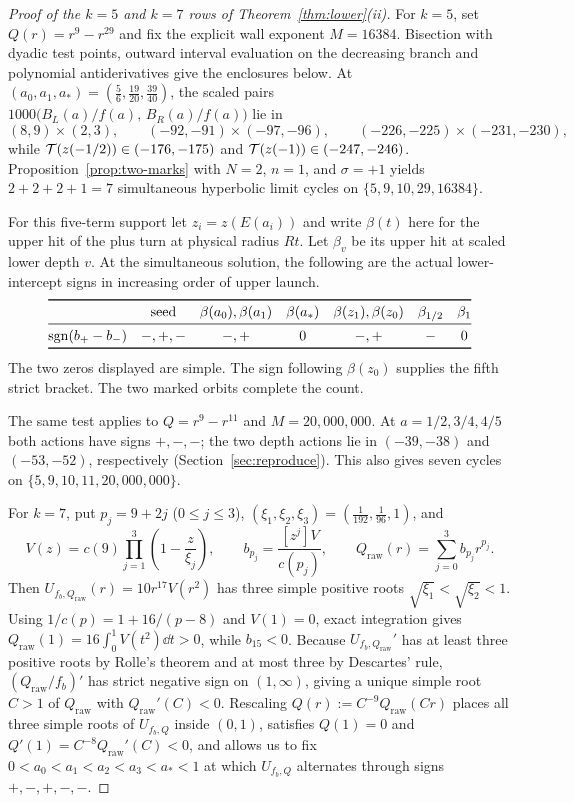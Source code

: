 \begin{proof}[Proof of the $k=5$ and $k=7$ rows of Theorem~\ref{thm:lower}\textup{(ii)}]
For $k=5$, set $Q(r)=r^9-r^{29}$ and fix the explicit wall exponent $M=16384$. Bisection with dyadic test points, outward interval evaluation on the
decreasing branch and polynomial antiderivatives give the enclosures below.
At $(a_0,a_1,a_*)=(\frac{5}{6},\frac{19}{20},\frac{39}{40})$, the scaled pairs
$1000\bigl(B_L(a)/f(a),\,B_R(a)/f(a)\bigr)$ lie in
\[
  (8,9)\times(2,3), \qquad (-92,-91)\times(-97,-96), \qquad (-226,-225)\times(-231,-230),
\]
while $\mathcal{T}(z(-1/2))\in(-176,-175)$ and $\mathcal{T}(z(-1))\in(-247,-246)$. Proposition~\ref{prop:two-marks}
with $N=2$, $n=1$, and $\sigma=+1$ yields $2+2+2+1=7$ simultaneous hyperbolic limit cycles on
$\{5,9,10,29,16384\}$.

For this five-term support let $z_i=z(E(a_i))$ and
write $\beta(t)$ here for the upper hit of the plus turn at physical
radius $Rt$. Let $\beta_v$ be its upper hit at scaled lower depth $v$.
At the simultaneous solution, the following are the actual
lower-intercept signs in increasing order of upper launch.
\[
\begin{array}{@{}lcccccc@{}}
\toprule
 &\text{seed}& \beta(a_0),\beta(a_1)&\beta(a_*)&
 \beta(z_1),\beta(z_0)&\beta_{1/2}&\beta_1\\
\midrule
\sgn(b_+-b_-)&-,+,-&-,+&0&-,+&-&0\\
\bottomrule
\end{array}
\]
The two zeros displayed are simple. The sign following $\beta(z_0)$
supplies the fifth strict bracket. The two marked orbits complete the count.

The same test applies to $Q=r^9-r^{11}$ and $M=20{,}000{,}000$.
At $a=1/2,3/4,4/5$ both actions have signs $+,-,-$; the two depth
actions lie in $(-39,-38)$ and $(-53,-52)$, respectively
(Section~\ref{sec:reproduce}). This also gives seven cycles on
$\{5,9,10,11,20{,}000{,}000\}$.

For $k=7$, put $p_j=9+2j$ ($0\le j\le 3$), $(\xi_1,\xi_2,\xi_3)=(\frac{1}{192},\frac{1}{96},1)$, and
\[
  V(z) = c(9)\prod_{j=1}^3\left(1 - \frac{z}{\xi_j}\right), \qquad b_{p_j} = \frac{[z^j]V}{c(p_j)},
  \qquad Q_{\mathrm{raw}}(r) = \sum_{j=0}^3 b_{p_j}r^{p_j}.
\]
Then $U_{f_b,Q_{\mathrm{raw}}}(r)=10r^{17}V(r^2)$ has three simple positive roots
$\sqrt{\xi_1}<\sqrt{\xi_2}<1$. Using $1/c(p)=1+16/(p-8)$ and $V(1)=0$, exact integration gives
$Q_{\mathrm{raw}}(1)=16\int_0^1 V(t^2)\dd t>0$, while $b_{15}<0$. Because $U_{f_b,Q_{\mathrm{raw}}}'$
has at least three positive roots by Rolle's theorem and at most three by Descartes' rule,
$(Q_{\mathrm{raw}}/f_b)'$ has strict negative sign on $(1,\infty)$, giving a unique simple root $C>1$
of $Q_{\mathrm{raw}}$ with $Q_{\mathrm{raw}}'(C)<0$. Rescaling $Q(r):=C^{-9}Q_{\mathrm{raw}}(Cr)$
places all three simple roots of $U_{f_b,Q}$ inside $(0,1)$, satisfies $Q(1)=0$ and
$Q'(1)=C^{-8}Q_{\mathrm{raw}}'(C)<0$, and allows us to fix $0<a_0<a_1<a_2<a_3<a_*<1$ at which
$U_{f_b,Q}$ alternates through signs $+,-,+,-,-$.


\end{proof}
